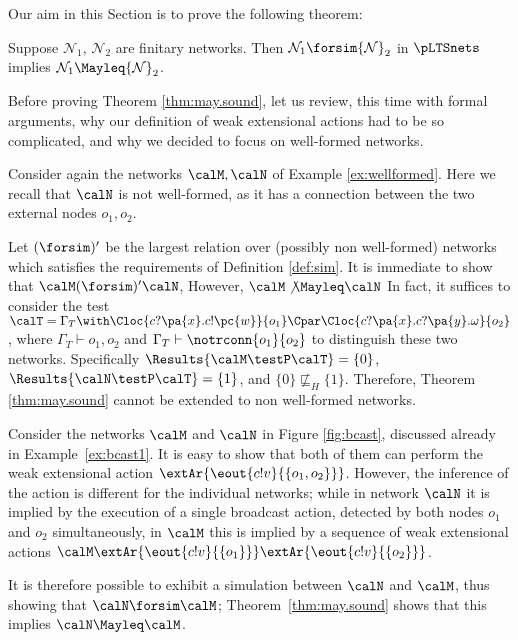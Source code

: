 \documentclass{LMCS}
\begin{document}
Our aim in this Section is to prove the following theorem:
\begin{thm}
\label{thm:may.sound}
Suppose ${\mathcal N}_1,\,{\mathcal N}_2$ are finitary networks.
Then  ${\mathcal N}_1 \forsim  {\mathcal N}_2$ in  $\pLTSnets$ 
implies ${\mathcal N}_1 \Mayleq  {\mathcal N}_2$.
\end{thm}

Before proving Theorem \ref{thm:may.sound}, let us review, this time with 
formal arguments, why our definition 
of weak extensional actions had to be so complicated, and why 
we decided to focus on well-formed networks.

\begin{exa}
\label{ex:sound.wellformed}
Consider again the networks $\calM, \calN$ of 
Example \ref{ex:wellformed}. Here we recall 
that $\calN$ is not well-formed, as it has 
a connection between the two external nodes 
$o_1, o_2$. 

Let $(\forsim)'$ be the largest relation over 
(possibly non well-formed) networks which satisfies the requirements 
of Definition \ref{def:sim}.
It is immediate to show that $\calM (\forsim)' \calN$, 
However, $\calM \not\Mayleq \calN$  
In fact, it suffices to consider the test 
$\calT = \Gamma_T \with \Cloc{c?\pa{x}.c!\pc{w}}{o_1} \Cpar 
\Cloc{c?\pa{x}.c?\pa{y}.\omega}{o_2}$, where 
$\Gamma_T \vdash o_1, o_2$ and $\Gamma_T \vdash \notrconn{o_1}{o_2}$ 
to distinguish these two networks. Specifically 
$\Results{\calM \testP \calT} = \{0\}$, 
$\Results{\calN \testP \calT} = \{1\}$, 
and $\{0\} \not\sqsubseteq_{H} \{1\}$. 
Therefore, Theorem \ref{thm:may.sound} cannot 
be extended to non well-formed networks.
\end{exa}

\begin{exa}
\label{ex:bcast}
Consider the networks $\calM$ and $\calN$ in Figure \ref{fig:bcast},
discussed already in Example~\ref{ex:bcast1}.  It is easy to show that
both of them can perform the weak extensional action
$\extAr{\eout{c!v}{\{o_1,o_2\}}}$. However, the inference of the
action is different for the individual networks; while in network
$\calN$ it is implied by the execution of a single broadcast action,
detected by both nodes $o_1$ and $o_2$ simultaneously, in $\calM$ this
is implied by a sequence of weak extensional actions $\calM
\extAr{\eout{c!v}{\{o_1\}}}\extAr{\eout{c!v}{\{o_2\}}}$.

It is therefore possible to exhibit a simulation between $\calN$ and
$\calM$, thus showing that $ \calN \forsim \calM$; 
Theorem~\ref{thm:may.sound} shows that this implies
$\calN \Mayleq \calM$.
\end{exa}
\end{document}
